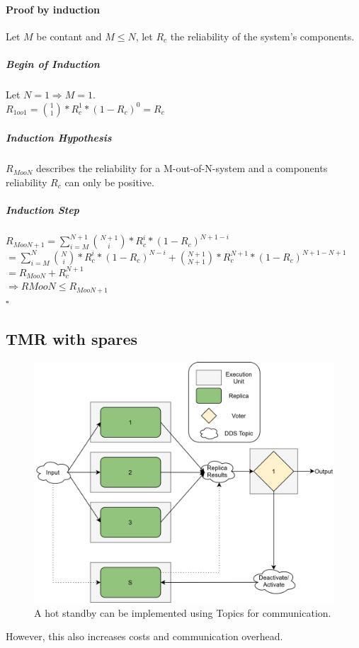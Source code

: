 \paragraph{Proof by induction}
Let $M$ be contant and $M \leq N$, let $R_{c}$ the reliability of the system's components.

\subparagraph{Begin of Induction}
Let $N = 1 \Rightarrow M = 1$.\\
$R_{1oo1} = {1 \choose 1} * R_{c}^1 * (1 - R_{c})^0 = R_{c}$

\subparagraph{Induction Hypothesis}
$R_{MooN}$ describes the reliability for a M-out-of-N-system and a components reliability $R_{c}$ can only be positive.

\subparagraph{Induction Step}
$R_{MooN+1} = \sum_{i=M}^{N+1} {N + 1 \choose i} * R_{c}^i * (1 - R_c)^{N + 1 - i}$\\
$= \sum_{i=M}^{N} {N \choose i} * R_{c}^i * (1 - R_c)^{N - i} + {N+1 \choose N+1} * R_c^{N+1} * (1 - R_c)^{N+1 - N+1}$\\
$= R_{MooN} + R_c^{N+1}$ \\
$\Rightarrow R{MooN} \leq R_{MooN+1}$\\
$\square$

\subsection{\Gls*{TMR} with spares}
\begin{figure}[!hb]
	\centering
	\includegraphics[width=0.75\linewidth]{images/TMRWithSparesDDS}
	\caption{A hot standby can be implemented using  Topics for communication.}
	\label{fig:TMRWithSparesDDS}
\end{figure}


However, this also increases costs and communication overhead.

